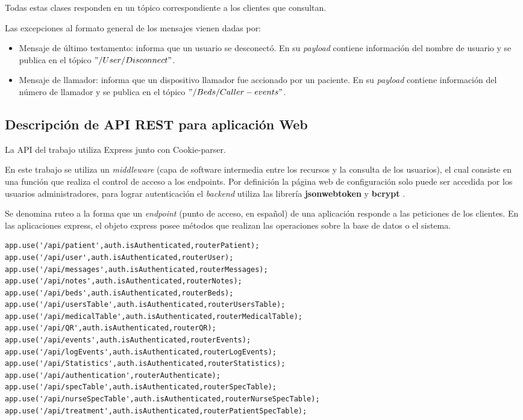 Todas estas clases responden en un tópico correspondiente a los clientes que consultan.

\pagebreak
Las excepciones al formato general de los mensajes vienen dadas por:
\begin{itemize}
\item Mensaje de último testamento: informa que un usuario se desconectó. En su \textit{payload} contiene información del nombre de usuario y se publica en el tópico $"/User/Disconnect"$.
\item Mensaje de llamador: informa que un dispositivo llamador fue accionado por un paciente. En su \textit{payload} contiene información del número de llamador y se publica en el tópico $"/Beds/Caller-events"$.

\end{itemize}


\pagebreak

\subsection{Descripción de API REST para aplicación Web}

La API del trabajo utiliza Express junto con Cookie-parser. 
 
En este trabajo se utiliza un \textit{middleware} (capa de software intermedia entre los recursos y la consulta de los usuarios), el cual consiste en una función que realiza el control de acceso a los endpoints. Por definición la página web de configuración solo puede ser accedida por los usuarios administradores, para lograr autenticación el \textit{backend} utiliza las librería \textbf{jsonwebtoken} \citep{WEBSITE:32} y \textbf{bcrypt} \citep{WEBSITE:31}. 

Se denomina ruteo a la forma que un \textit{endpoint} (punto de acceso, en español) de una aplicación responde a las peticiones de los clientes. En las aplicaciones express, el objeto express posee métodos que realizan las operaciones sobre la base de datos o el sistema.

\begin{lstlisting}[caption=  Rutas express]
app.use('/api/patient',auth.isAuthenticated,routerPatient);
app.use('/api/user',auth.isAuthenticated,routerUser);
app.use('/api/messages',auth.isAuthenticated,routerMessages);
app.use('/api/notes',auth.isAuthenticated,routerNotes);
app.use('/api/beds',auth.isAuthenticated,routerBeds);
app.use('/api/usersTable',auth.isAuthenticated,routerUsersTable);
app.use('/api/medicalTable',auth.isAuthenticated,routerMedicalTable);
app.use('/api/QR',auth.isAuthenticated,routerQR);
app.use('/api/events',auth.isAuthenticated,routerEvents);
app.use('/api/logEvents',auth.isAuthenticated,routerLogEvents);
app.use('/api/Statistics',auth.isAuthenticated,routerStatistics);
app.use('/api/authentication',routerAuthenticate);
app.use('/api/specTable',auth.isAuthenticated,routerSpecTable);
app.use('/api/nurseSpecTable',auth.isAuthenticated,routerNurseSpecTable);
app.use('/api/treatment',auth.isAuthenticated,routerPatientSpecTable);
\end{lstlisting}


